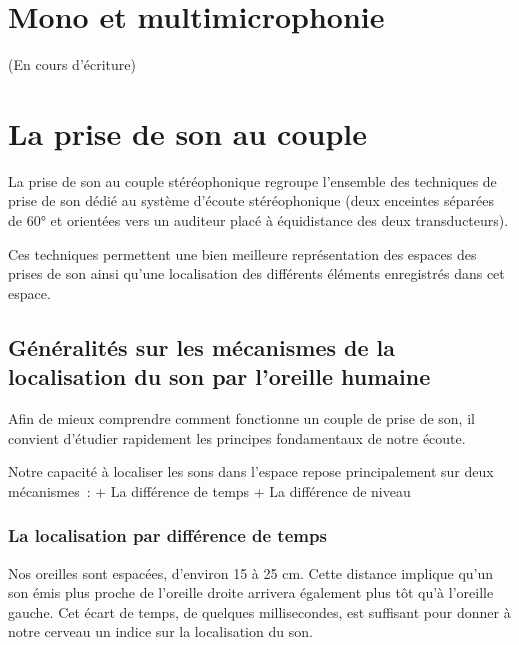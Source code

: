 \documentclass[
]{book}
\begin{document}
\hypertarget{mono-et-multimicrophonie}{%
\chapter{Mono et multimicrophonie}\label{mono-et-multimicrophonie}}

(En cours d'écriture)

\hypertarget{la-prise-de-son-au-couple}{%
\chapter{La prise de son au couple}\label{la-prise-de-son-au-couple}}

La prise de son au couple stéréophonique regroupe l'ensemble des techniques de prise de son dédié au système d'écoute stéréophonique (deux enceintes séparées de 60° et orientées vers un auditeur placé à équidistance des deux transducteurs).

Ces techniques permettent une bien meilleure représentation des espaces des prises de son ainsi qu'une localisation des différents éléments enregistrés dans cet espace.

\hypertarget{guxe9nuxe9ralituxe9s-sur-les-muxe9canismes-de-la-localisation-du-son-par-loreille-humaine}{%
\section{Généralités sur les mécanismes de la localisation du son par l'oreille humaine}\label{guxe9nuxe9ralituxe9s-sur-les-muxe9canismes-de-la-localisation-du-son-par-loreille-humaine}}

Afin de mieux comprendre comment fonctionne un couple de prise de son, il convient d'étudier rapidement les principes fondamentaux de notre écoute.

Notre capacité à localiser les sons dans l'espace repose principalement sur deux mécanismes~:
+ La différence de temps
+ La différence de niveau

\hypertarget{la-localisation-par-diffuxe9rence-de-temps}{%
\subsection{La localisation par différence de temps}\label{la-localisation-par-diffuxe9rence-de-temps}}

Nos oreilles sont espacées, d'environ 15 à 25 cm. Cette distance implique qu'un son émis plus proche de l'oreille droite arrivera également plus tôt qu'à l'oreille gauche. Cet écart de temps, de quelques millisecondes, est suffisant pour donner à notre cerveau un indice sur la localisation du son.
\end{document}
